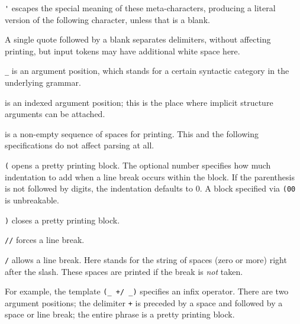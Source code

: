 \begin{isabellebody}
\begin{isamarkuptext}
\begin{description}
  \item \verb|'| escapes the special meaning of these
  meta-characters, producing a literal version of the following
  character, unless that is a blank.

  A single quote followed by a blank separates delimiters, without
  affecting printing, but input tokens may have additional white space
  here.

  \item \verb|_| is an argument position, which stands for a
  certain syntactic category in the underlying grammar.

  \item {} is an indexed argument position; this is the place
  where implicit structure arguments can be attached.

  \item {} is a non-empty sequence of spaces for printing.
  This and the following specifications do not affect parsing at all.

  \item \verb|(| opens a pretty printing block.  The
  optional number specifies how much indentation to add when a line
  break occurs within the block.  If the parenthesis is not followed
  by digits, the indentation defaults to 0.  A block specified via
  \verb|(00| is unbreakable.

  \item \verb|)| closes a pretty printing block.

  \item \verb|//| forces a line break.

  \item \verb|/| allows a line break.  Here 
  stands for the string of spaces (zero or more) right after the
  slash.  These spaces are printed if the break is \emph{not} taken.

  \end{description}

  For example, the template \verb|(_ +/ _)| specifies an infix
  operator.  There are two argument positions; the delimiter
  \verb|+| is preceded by a space and followed by a space or
  line break; the entire phrase is a pretty printing block.


\end{isamarkuptext}
\end{isabellebody}
